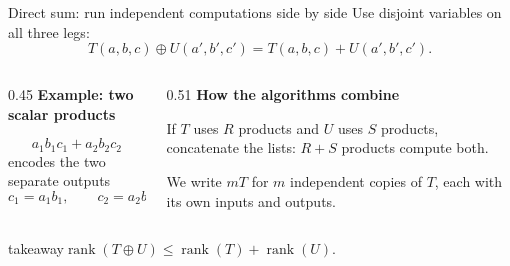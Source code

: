 \documentclass[aspectratio=169,11pt]{beamer}
\newcommand{\rank}{\operatorname{rank}}
\newcommand{\takeaway}[1]{\begin{beamercolorbox}[sep=0.65em,wd=\linewidth]{takeaway}#1\end{beamercolorbox}}
\begin{document}
\begin{frame}{Direct sum: run independent computations side by side}
  Use disjoint variables on all three legs:
  \[
    T(a,b,c)\oplus U(a',b',c')=T(a,b,c)+U(a',b',c').
  \]
  \begin{columns}[T,onlytextwidth]
    \begin{column}{0.45\textwidth}
      \textbf{Example: two scalar products}\par\smallskip
      \[
        a_1b_1c_1+a_2b_2c_2
      \]
      encodes the two separate outputs
      \[
        c_1=a_1b_1,\qquad c_2=a_2b_2.
      \]
    \end{column}
    \begin{column}{0.51\textwidth}
      \textbf{How the algorithms combine}\par\smallskip
      If $T$ uses $R$ products and $U$ uses $S$ products,
      concatenate the lists: $R+S$ products compute both.
      \par\medskip
      We write $mT$ for $m$ independent copies of $T$,
      each with its own inputs and outputs.
    \end{column}
  \end{columns}
  \medskip
  \takeaway{$\displaystyle
    \rank(T\oplus U)\le\rank(T)+\rank(U).
  $}
\end{frame}
\end{document}
